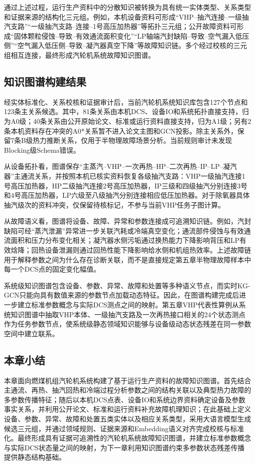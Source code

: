 通过上述过程，运行生产资料中的分散知识被转换为具有统一实体类型、关系类型和证据来源的结构化三元组。例如，本机设备资料可形成“VHP--抽汽连接--一级抽汽支路”“一级抽汽支路--连接--1号高压加热器”等拓扑三元组；公开故障资料可形成“固体颗粒侵蚀--导致--有效通流面积变化”“LP轴端汽封缺陷--导致--空气漏入低压侧”“空气漏入低压侧--导致--凝汽器真空下降”等故障知识链。多个经过校核的三元组相互连接，最终形成汽轮机系统故障知识图谱。

\subsection{知识图谱构建结果}
\label{subsec:kg_result_v5}

经实体标准化、关系校核和证据审计后，当前汽轮机系统知识库包含127个节点和123条主关系候选。其中，81条关系由本机DCS、设备IO和系统拓扑直接支持，归为A0级；40条关系由公开原始论文、标准或运行资料直接支持，归为A1级；另有2条本机资料存在冲突的A0*关系暂不进入论文主图和GCN投影。除主关系外，保留7条B级热力推断关系，仅用于半物理故障场景分析。当前规则审计未发现Blocking级Schema错误。

从设备拓扑看，图谱保存“主蒸汽--VHP--一次再热--HP--二次再热--IP--LP--凝汽器”主通流关系，并按照本机已核实资料恢复各级抽汽支路：VHP一级抽汽连接1号高压加热器，HP二级抽汽连接2号高压加热器，IP三级和四级抽汽分别连接3号和4号高压加热器，LP六级至八级抽汽分别连接相应低压加热器。对于除氧器具体抽汽级次的资料冲突，仅保留待核标记，不参与当前VHP任务子图计算。

从故障语义看，图谱将设备、故障、异常和参数连接成可追溯知识链。例如，汽封缺陷可经“蒸汽泄漏”异常进一步关联汽耗或冷端真空变化；通流部件侵蚀与有效通流面积和压力分布变化相关；凝汽器水侧污垢通过换热能力下降影响背压和LP有效焓降；回热设备泄漏则通过回热性能下降影响给水侧和机组热效率。上述故障链用于解释参数之间为什么存在诊断关联，而不是直接规定第五章半物理故障样本中每一个DCS点的固定变化幅值。

系统级知识图谱包含设备、参数、异常、故障和处置等多种语义节点，而实时KG-GCN只能向具有数值来源的参数节点加载动态特征。因此，在图谱构建完成后进一步建立标准参数概念与实际DCS测点之间的映射。第五章VHP代表性算例从系统知识图谱中抽取VHP本体、一级抽汽支路及一次再热接口相关的24个状态测点作为任务参数节点，使系统级静态领域知识能够与设备级动态状态残差在同一参数空间中建立联系。


\subsection{本章小结}

本章面向燃煤机组汽轮机系统构建了基于运行生产资料的故障知识图谱。首先结合主通流、再热、抽汽回热和冷端过程分析参数之间的结构关联以及典型热力故障的多参数传播特征；随后以本机DCS点表、设备IO和系统边界资料确定设备及参数事实关系，并利用公开论文、标准和运行资料补充故障机理知识；在此基础上定义设备、参数、异常、故障和处置五类实体以及相应关系类型，采用大语言模型生成候选三元组，并通过领域规则、证据来源和Embedding语义对齐完成校核与标准化。最终形成具有证据可追溯性的汽轮机系统故障知识图谱，并建立标准参数概念与实际DCS状态量之间的映射，为下一章利用知识图谱约束多参数状态残差传播提供静态结构基础。